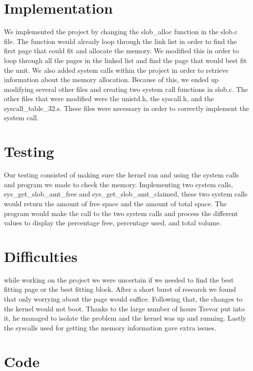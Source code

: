 \documentclass[letterpaper,10pt]{article}
\begin{document}
\section*{Implementation }

We implemented the project by changing the slob\_alloc function in
the slob.c file. The function would already loop through the link
list in order to find the first page that could fit and allocate the
memory. We modified this in order to loop through all the pages in
the linked list and find the page that would best fit the unit. We
also added system calls within the project in order to retrieve information
about the memory allocation. Because of this, we ended up modifying
several other files and creating two system call functions in slob.c.
The other files that were modified were the unistd.h, the syscall.h,
and the syscall\_table\_32.s. These files were necessary in order
to correctly implement the system call. 


\section*{Testing }

Our testing consisted of making sure the kernel ran and using the
system calls and program we made to check the memory. Implementing
two system calls, sys\_get\_slob\_amt\_free and sys\_get\_slob\_amt\_claimed,
these two system calls would return the amount of free space and the
amount of total space. The program would make the call to the two
system calls and process the different values to display the percentage
free, percentage used, and total volume. 


\section*{Difficulties }

while working on the project we were uncertain if we needed to find
the best fitting page or the best fitting block. After a short burst
of research we found that only worrying about the page would suffice.
Following that, the changes to the kernel would not boot. Thanks to
the large number of hours Trevor put into it, he managed to isolate
the problem and the kernel was up and running. Lastly the syscalls
used for getting the memory information gave extra issues.

\section*{Code}

\end{document}

